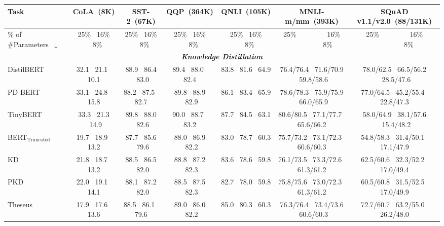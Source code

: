 \begin{table}[thb!]
	\centering
	\scriptsize
	\begin{tabular}{|l|cccccc|}
		\hline
		Task &CoLA~(8K) & SST-2~(67K)                                                  & QQP~(364K)                                                    & QNLI~(105K)                                                & MNLI-m/mm~(393K)                                                 & SQuAD v1.1/v2.0~(88/131K)         \\
		\hline
		\% of \#Parameters~$\downarrow$   &25\% ~16\%  ~~8\%            &25\% ~16\%  ~~8\%             &25\% ~16\%  ~~8\%            &25\% ~16\%  ~~8\%            &25\% ~~~~~~~~16\%  ~~~~~~~~~8\%     &25\% ~~~~~~~~16\%  ~~~~~~~~8\%       \\
		\hline
		\multicolumn{7}{|c|}{\textit{\textbf{Knowledge Distillation}}}   \\
		\hline
		DistilBERT  &32.1~ 21.1~ 10.1    & 88.9 ~86.4 ~83.0          & 89.4~ 88.0~ 82.4          & 83.8~ 81.6~ 64.9          & 76.4/76.4 ~71.6/70.9 ~59.8/58.6          & 78.0/62.5~ 66.5/56.2 ~28.5/47.6       \\
		PD-BERT     &33.1~ 24.8~ 15.8   & 88.2~ 87.5~ 82.7          & 89.8 ~88.9 ~82.9          & 86.1~ 83.4~ 65.9          & 78.6/78.3 ~75.9/75.9 ~66.0/65.9          & 77.0/64.5 ~45.2/55.4~ 22.8/47.3       \\
		TinyBERT    &33.3~ 21.3 ~14.9   & 89.8 ~88.0 ~82.6          & 90.0~ 88.7~ 83.2          & 87.7 ~84.5~ 63.1          & 80.6/80.5~ 77.1/77.7~ 65.6/66.2          & 58.0/64.9 ~38.1/57.6 ~15.4/48.2     \\
		BERT$_{\text{Truncated}}$  &19.7~ 18.9~ 13.2 & 87.7 ~85.6 ~79.6          & 88.0~ 86.9 ~82.2          & 83.0 ~78.7 ~60.3          & 75.7/73.2~ 73.1/72.3~ 60.6/60.3          & 54.8/58.3~ 31.4/50.1~ 17.1/47.9        \\
		KD    &21.8~ 18.7~ 13.2  & 88.5~ 86.5 ~82.0           & 88.8~ 87.2 ~82.3          & 83.6 ~78.6~ 59.8          & 76.1/73.5 ~73.3/72.6~ 61.3/61.2          & 62.5/60.6 ~32.3/52.2~ 17.0/49.4       \\
		PKD  &22.0~ 19.1~ 14.1   & 88.1~ 87.2 ~82.0          & 88.5~ 87.5 ~82.3          & 82.7~ 78.0~ 59.8          & 75.8/75.6 ~73.0/72.3~ 61.3/61.2          &60.5/60.8~ 31.5/52.5~ 17.0/49.9                                             \\
		Theseus&17.9~ 17.6~ 13.6  & 88.5~ 86.1~ 79.6          & 89.0 ~86.0 ~82.2          & 85.0 ~80.3~ 60.3          & 76.3/76.4~ 73.4/73.6 ~60.6/60.3          &72.7/60.7~ 63.2/55.0~ 26.2/48.0                                            \\

\end{tabular}
\end{table}

